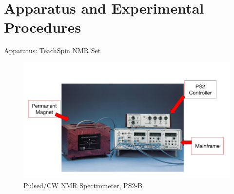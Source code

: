 \documentclass[aspectratio=169,xcolor=dvipsnames]{beamer}
\begin{document}
\section{Apparatus and Experimental Procedures}

\begin{frame}{Apparatus: TeachSpin NMR Set} 
    \begin{figure}
        \includegraphics[width = 0.8\linewidth]{figs/teachspin.png}
        \caption{Pulsed/CW NMR Spectrometer, PS2-B}
    \end{figure}
\end{frame}
\end{document}
